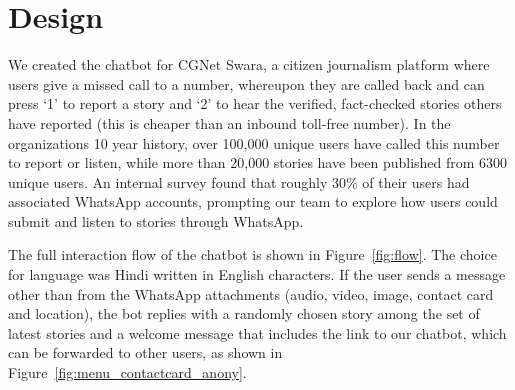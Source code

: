 \section{Design}
We created the chatbot for CGNet Swara, a citizen journalism platform where users give a missed call to a number, whereupon they are called back and can press `1' to report a story and `2' to hear the verified, fact-checked stories others have reported (this is cheaper than an inbound toll-free number). In the organizations 10 year history, over 100,000 unique users have called this number to report or listen, while more than 20,000 stories have been published from 6300 unique users. An internal survey found that roughly 30\% of their users had associated WhatsApp accounts, prompting our team to explore how users could submit and listen to stories through WhatsApp.

The full interaction flow of the chatbot is shown in Figure~\ref{fig:flow}. The choice for language was Hindi written in English characters. If the user sends a message other than from the WhatsApp attachments (audio, video, image, contact card and location), the bot replies with a randomly chosen story among the set of latest stories and a welcome message that includes the link to our chatbot, which can be forwarded to other users, as shown in Figure~\ref{fig:menu_contactcard_anony}. 

